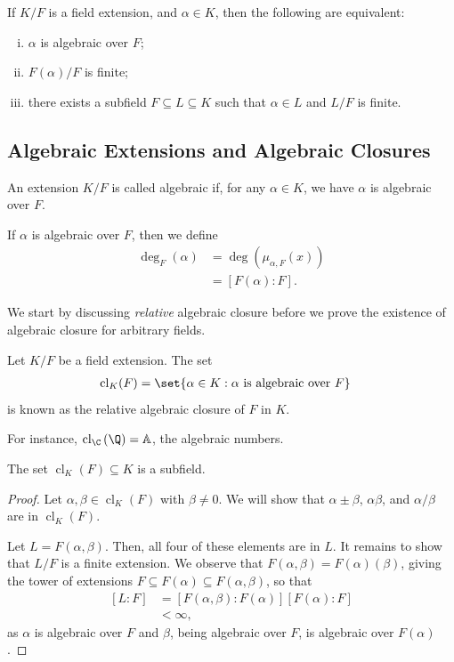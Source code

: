 \documentclass[10pt]{mypackage}
\begin{document}
\begin{remark}
  If $K/F$ is a field extension, and $\alpha\in K$, then the following are equivalent:
  \begin{enumerate}[(i)]
    \item $\alpha$ is algebraic over $F$;
    \item $F(\alpha)/F$ is finite;
    \item there exists a subfield $F\subseteq L\subseteq K$ such that $\alpha\in L$ and $L/F$ is finite.
  \end{enumerate}
\end{remark}
\subsection{Algebraic Extensions and Algebraic Closures}%
\begin{definition}
  An extension $K/F$ is called algebraic if, for any $\alpha\in K$, we have $\alpha$ is algebraic over $F$.

  If $\alpha$ is algebraic over $F$, then we define
  \begin{align*}
    \deg_F(\alpha) &= \deg\left( \mu_{\alpha,F}(x) \right)\\
                   &= \left[ F(\alpha):F \right].
  \end{align*}
\end{definition}
We start by discussing \textit{relative} algebraic closure before we prove the existence of algebraic closure for arbitrary fields.
\begin{definition}
  Let $K/F$ be a field extension. The set
  \begin{align*}
    \operatorname{cl}_K(F) &= \set{\alpha\in K : \alpha\text{ is algebraic over }F}
  \end{align*}
  is known as the relative algebraic closure of $F$ in $K$.
\end{definition}
For instance, $\operatorname{cl}_{\C}\left( \Q \right) = \mathbb{A}$, the algebraic numbers.
\begin{theorem}
  The set $\operatorname{cl}_K(F)\subseteq K$ is a subfield.
\end{theorem}
\begin{proof}
  Let $\alpha,\beta\in \operatorname{cl}_K(F)$ with $\beta\neq 0$. We will show that $\alpha\pm\beta$, $\alpha\beta$, and $\alpha/\beta$ are in $\operatorname{cl}_K(F)$.

  Let $L = F\left( \alpha,\beta \right)$. Then, all four of these elements are in $L$. It remains to show that $L/F$ is a finite extension. We observe that $F\left( \alpha,\beta \right) = F\left( \alpha \right)\left( \beta \right)$, giving the tower of extensions $F\subseteq F\left( \alpha \right)\subseteq F\left( \alpha,\beta \right)$, so that
  \begin{align*}
    \left[ L:F \right] &= \left[ F\left( \alpha,\beta \right):F\left( \alpha \right) \right]\left[ F\left( \alpha \right):F \right]\\
                       &< \infty,
  \end{align*}
  as $\alpha$ is algebraic over $F$ and $\beta$, being algebraic over $F$, is algebraic over $F\left( \alpha \right)$.
\end{proof}
\end{document}
